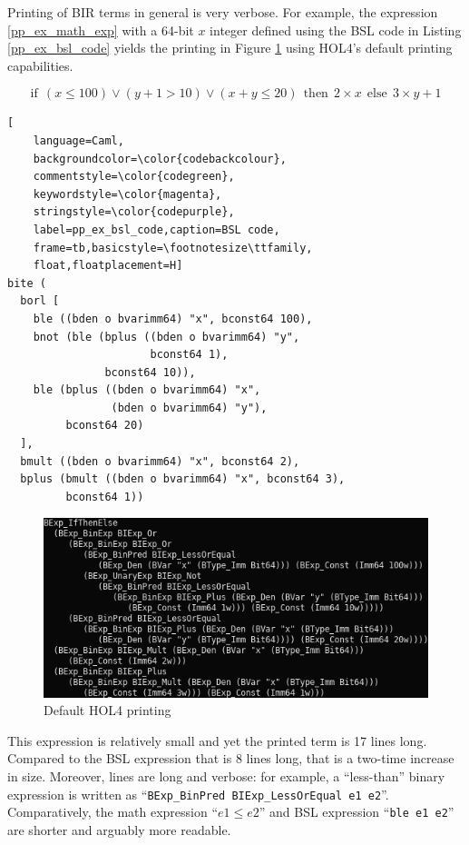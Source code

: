 \documentclass{kththesis}
\begin{document}
{Printing of BIR terms in general is very verbose. For example, the expression \ref{pp_ex_math_exp} with a 64-bit $x$ integer defined using the BSL code in Listing \ref{pp_ex_bsl_code} yields the printing in Figure \ref{pp_ex_default_printing} using HOL4's default printing capabilities.

\begin{equation}
    \text{if}~~(x \leq 100) \lor (y + 1 > 10) \lor (x + y \leq 20)~~\text{then}~~2 \times x~~\text{else}~~3 \times y + 1
    \label{pp_ex_math_exp}
\end{equation}

\begin{lstlisting}[
    language=Caml,
    backgroundcolor=\color{codebackcolour},
    commentstyle=\color{codegreen},
    keywordstyle=\color{magenta},
    stringstyle=\color{codepurple},
    label=pp_ex_bsl_code,caption=BSL code,
    frame=tb,basicstyle=\footnotesize\ttfamily,
    float,floatplacement=H]
bite (
  borl [
    ble ((bden o bvarimm64) "x", bconst64 100),
    bnot (ble (bplus ((bden o bvarimm64) "y",
                      bconst64 1),
               bconst64 10)),
    ble (bplus ((bden o bvarimm64) "x",
                (bden o bvarimm64) "y"),
         bconst64 20)
  ],
  bmult ((bden o bvarimm64) "x", bconst64 2),
  bplus (bmult ((bden o bvarimm64) "x", bconst64 3),
         bconst64 1))
\end{lstlisting}

\begin{figure}[!h]
	\includegraphics[width=\textwidth]{figures/pp_ex_default_printing.png}
	\centering
	\caption{Default HOL4 printing}
	\label{pp_ex_default_printing}
\end{figure}

This expression is relatively small and yet the printed term is 17 lines long. Compared to the BSL expression that is 8 lines long\footnotemark, that is a two-time increase in size. Moreover, lines are long and verbose: for example, a ``less-than'' binary expression is written as ``\texttt{BExp\_BinPred BIExp\_LessOrEqual e1 e2}''. Comparatively, the math expression ``$e1 \leq e2$'' and BSL expression ``\texttt{ble e1 e2}'' are shorter and arguably more readable.

}
\end{document}
